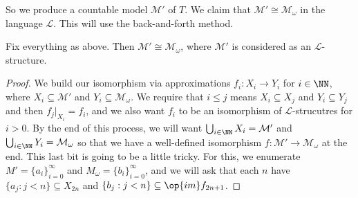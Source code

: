\documentclass[../notes.tex]{subfiles}
\begin{document}
So we produce a countable model $\mathcal M'$ of $T$. We claim that $\mathcal M'\cong\mathcal M_\omega$ in the language $\mathcal L$. This will use the back-and-forth method.
\begin{lemma}
	Fix everything as above. Then $\mathcal M'\cong\mathcal M_\omega$, where $\mathcal M'$ is considered as an $\mathcal L$-structure.
\end{lemma}
\begin{proof}
	We build our isomorphism via approximations $f_i\colon X_i\to Y_i$ for $i\in\NN$, where $X_i\subseteq\mathcal M'$ and $Y_i\subseteq\mathcal M_\omega$. We require that $i\le j$ means $X_i\subseteq X_j$ and $Y_i\subseteq Y_j$ and then $f_j|_{X_i}=f_i$, and we also want $f_i$ to be an isomorphism of $\mathcal L$-strucutres for $i>0$. By the end of this process, we will want $\bigcup_{i\in\NN}X_i=\mathcal M'$ and $\bigcup_{i\in\NN}Y_i=\mathcal M_\omega$ so that we have a well-defined isomorphism $f\colon\mathcal M'\to\mathcal M_\omega$ at the end. This last bit is going to be a little tricky. For this, we enumerate $M'=\{a_i\}_{i=0}^\infty$ and $M_\omega=\{b_i\}_{i=0}^\infty$, and we will ask that each $n$ have $\{a_j:j<n\}\subseteq X_{2n}$ and $\{b_j:j<n\}\subseteq\op{im}f_{2n+1}$.


\end{proof}
\end{document}
